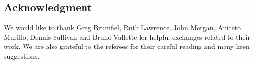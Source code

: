 
\subsection*{Acknowledgment}

We would like to thank Greg Brumfiel, Ruth Lawrence, John Morgan, Aniceto Murillo, Dennis Sullivan and Bruno Vallette for helpful exchanges related to their work.
We are also grateful to the referees for their careful reading and many keen suggestions.